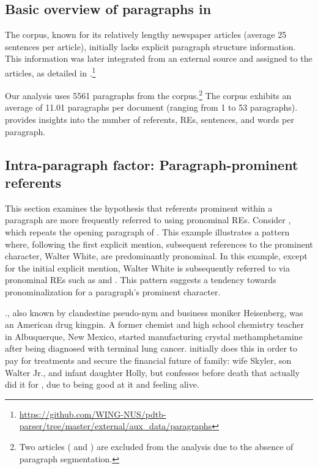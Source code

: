\subsection{Basic overview of paragraphs in \wsj}\label{subsec:parbasicstat}

The \wsj corpus, known for its relatively lengthy newspaper articles (average 25 sentences per article), initially lacks explicit paragraph structure information. This information was later integrated from an external source and assigned to the articles, as detailed in .\footnote{\url{https://github.com/WING-NUS/pdtb-parser/tree/master/external/aux_data/paragraphs}}

Our analysis uses 5561 paragraphs from the \wsj corpus.\footnote{Two articles ( and ) are excluded from the analysis due to the absence of paragraph segmentation.} The corpus exhibits an average of 11.01 paragraphs per document (ranging from 1 to 53 paragraphs).  provides insights into the number of referents, REs, sentences, and words per paragraph.




\subsection{Intra-paragraph factor: Paragraph-prominent referents}\label{subsubsec:promInPar}

This section examines the hypothesis that referents prominent within a paragraph are more frequently referred to using pronominal REs. Consider , which repeats the opening paragraph of . This example illustrates a pattern where, following the first explicit mention, subsequent references to the prominent character, Walter White, are predominantly pronominal. In this example, except for the initial explicit mention, Walter White is subsequently referred to via pronominal REs such as  and . This pattern suggests a tendency towards pronominalization for a paragraph's prominent character.

\begin{exe}
	\ex\label{ex:walterwhite} ., also known by  clandestine pseudo-nym and business moniker Heisenberg, was an American drug kingpin. A former chemist and high school chemistry teacher in Albuquerque, New Mexico,  started manufacturing crystal methamphetamine after being diagnosed with terminal lung cancer.  initially does this in order to pay for  treatments and secure the financial future of  family: wife Skyler, son Walter Jr., and infant daughter Holly, but confesses before  death that  actually did it for , due to being good at it and feeling alive.
\end{exe}


